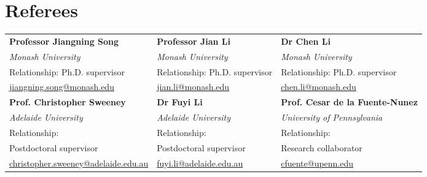 \documentclass[10pt,a4paper]{article}
\begin{document}
  \section{Referees}
  {\small
  \begin{tabularx}{\textwidth}{@{}>{\raggedright\arraybackslash}X >{\raggedright\arraybackslash}X >{\raggedright\arraybackslash}X@{}}
    \textbf{Professor Jiangning Song} &
    \textbf{Professor Jian Li} &
    \textbf{Dr Chen Li} \\
    \textit{Monash University} &
    \textit{Monash University} &
    \textit{Monash University} \\
    Relationship: \newline Ph.D. supervisor &
    Relationship: \newline Ph.D. supervisor &
    Relationship: \newline Ph.D. supervisor \\
    \href{mailto:jiangning.song@monash.edu}{jiangning.song@monash.edu} &
    \href{mailto:jian.li@monash.edu}{jian.li@monash.edu} &
    \href{mailto:chen.li@monash.edu}{chen.li@monash.edu} \\[10pt]
    \textbf{\small Prof. Christopher Sweeney} & \textbf{Dr Fuyi Li} & \textbf{\small Prof. Cesar de la Fuente-Nunez} \\
    \textit{Adelaide University} & \textit{Adelaide University} & \textit{University of Pennsylvania} \\
    Relationship: & Relationship: & Relationship: \\
    Postdoctoral supervisor & Postdoctoral supervisor & Research collaborator \\
    \href{mailto:christopher.sweeney@adelaide.edu.au}{\small christopher.sweeney@adelaide.edu.au} & \href{mailto:fuyi.li@adelaide.edu.au}{fuyi.li@adelaide.edu.au} & \href{mailto:cfuente@upenn.edu}{cfuente@upenn.edu}
  \end{tabularx}
  }
\fi
\end{document}
